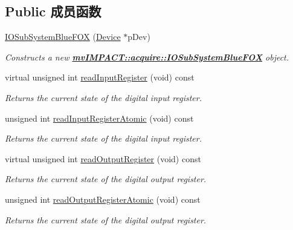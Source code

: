 \subsection*{Public 成员函数}
\begin{DoxyCompactItemize}
\item 
\hyperlink{classmv_i_m_p_a_c_t_1_1acquire_1_1_i_o_sub_system_blue_f_o_x_a5ec444f1ca44491ea53969ba7690e736}{I\+O\+Sub\+System\+Blue\+F\+O\+X} (\hyperlink{classmv_i_m_p_a_c_t_1_1acquire_1_1_device}{Device} $\ast$p\+Dev)
\begin{DoxyCompactList}\small\item\em Constructs a new {\bfseries \hyperlink{classmv_i_m_p_a_c_t_1_1acquire_1_1_i_o_sub_system_blue_f_o_x}{mv\+I\+M\+P\+A\+C\+T\+::acquire\+::\+I\+O\+Sub\+System\+Blue\+F\+O\+X}} object. \end{DoxyCompactList}\item 
virtual unsigned int \hyperlink{classmv_i_m_p_a_c_t_1_1acquire_1_1_i_o_sub_system_blue_f_o_x_a5f72cdec1f31de3f4a277dbeef08ec3f}{read\+Input\+Register} (void) const 
\begin{DoxyCompactList}\small\item\em Returns the current state of the digital input register. \end{DoxyCompactList}\item 
unsigned int \hyperlink{classmv_i_m_p_a_c_t_1_1acquire_1_1_i_o_sub_system_blue_f_o_x_ac5eab2ad62eda386fd85b1302d34b19a}{read\+Input\+Register\+Atomic} (void) const 
\begin{DoxyCompactList}\small\item\em Returns the current state of the digital input register. \end{DoxyCompactList}\item 
virtual unsigned int \hyperlink{classmv_i_m_p_a_c_t_1_1acquire_1_1_i_o_sub_system_blue_f_o_x_a966200aab95be5ab603bfeb79d7dbe69}{read\+Output\+Register} (void) const 
\begin{DoxyCompactList}\small\item\em Returns the current state of the digital output register. \end{DoxyCompactList}\item 
unsigned int \hyperlink{classmv_i_m_p_a_c_t_1_1acquire_1_1_i_o_sub_system_blue_f_o_x_a48b3fbb9d136f6ca665da43dbf837ecc}{read\+Output\+Register\+Atomic} (void) const 
\begin{DoxyCompactList}\small\item\em Returns the current state of the digital output register. \end{DoxyCompactList}\item 

\end{DoxyCompactItemize}
